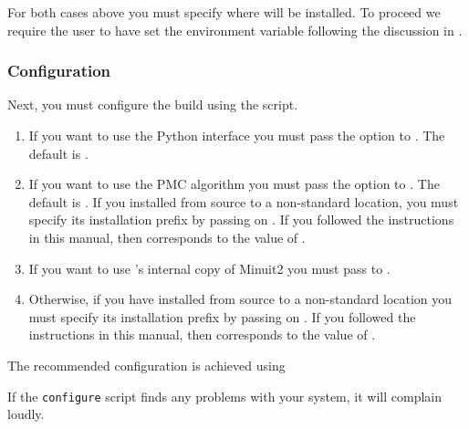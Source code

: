 For both cases above you must specify where \EOS will be installed. To proceed we
require the user to have set the  environment variable following
the discussion in .

\subsubsection{Configuration}

Next, you must configure the \EOS build using the  script.
\begin{enumerate}
    \item If you want to use the \EOS Python interface you must pass the  option
    to . The default is .

    \item If you want to use the \EOS \gls{PMC} algorithm you must pass the  option
    to . The default is .
    If you installed  from source to a non-standard location,
    you must specify its installation prefix by passing on
    . If you followed the instructions in this
    manual, then  corresponds to the value of .

    \item If you want to use 's internal copy of Minuit2 you must
    pass  to .

    \item Otherwise, if you have installed  from source to a non-standard location
    you must specify its installation prefix by passing on
    . If you followed the instructions in this
    manual, then  corresponds to the value of .
\end{enumerate}
%
The recommended configuration is achieved using
If the \texttt{configure} script finds any problems with your system, it will complain loudly.\\

